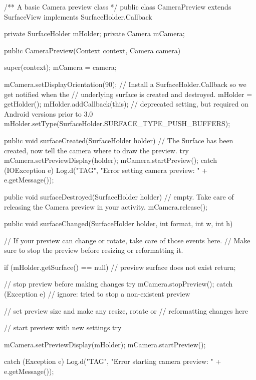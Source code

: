 \documentclass[	DIV=calc,%
							paper=a4,%
							fontsize=11pt]{scrartcl}	 					%
\begin{document}
\begin{javacode}
	/** A basic Camera preview class */
	public class CameraPreview extends SurfaceView implements SurfaceHolder.Callback {

	    private SurfaceHolder mHolder;
	    private Camera mCamera;

	    public CameraPreview(Context context, Camera camera) {
	        super(context);
	        mCamera = camera;

	        mCamera.setDisplayOrientation(90);
	        // Install a SurfaceHolder.Callback so we get notified when the
	        // underlying surface is created and destroyed.
	        mHolder = getHolder();
	        mHolder.addCallback(this);
	        // deprecated setting, but required on Android versions prior to 3.0
	        mHolder.setType(SurfaceHolder.SURFACE_TYPE_PUSH_BUFFERS);
	    }

	    public void surfaceCreated(SurfaceHolder holder) {
	        // The Surface has been created, now tell the camera where to draw the preview.
	        try {
	            mCamera.setPreviewDisplay(holder);
	            mCamera.startPreview();
	        } catch (IOException e) {
	            Log.d("TAG", "Error setting camera preview: " + e.getMessage());
	        }
	    }

	    public void surfaceDestroyed(SurfaceHolder holder) {
	        // empty. Take care of releasing the Camera preview in your activity.
	        mCamera.release();
	    }

	    public void surfaceChanged(SurfaceHolder holder, int format, int w, int h) {
	        // If your preview can change or rotate, take care of those events here.
	        // Make sure to stop the preview before resizing or reformatting it.

	        if (mHolder.getSurface() == null) {
	            // preview surface does not exist
	            return;
	        }

	        // stop preview before making changes
	        try {
	            mCamera.stopPreview();
	        } catch (Exception e) {
	            // ignore: tried to stop a non-existent preview
	        }

	        // set preview size and make any resize, rotate or
	        // reformatting changes here

	        // start preview with new settings
	        try {
	            mCamera.setPreviewDisplay(mHolder);
	            mCamera.startPreview();

	        } catch (Exception e) {
	            Log.d("TAG", "Error starting camera preview: " + e.getMessage());
	        }
	    }
	}
\end{javacode}
\end{document}
